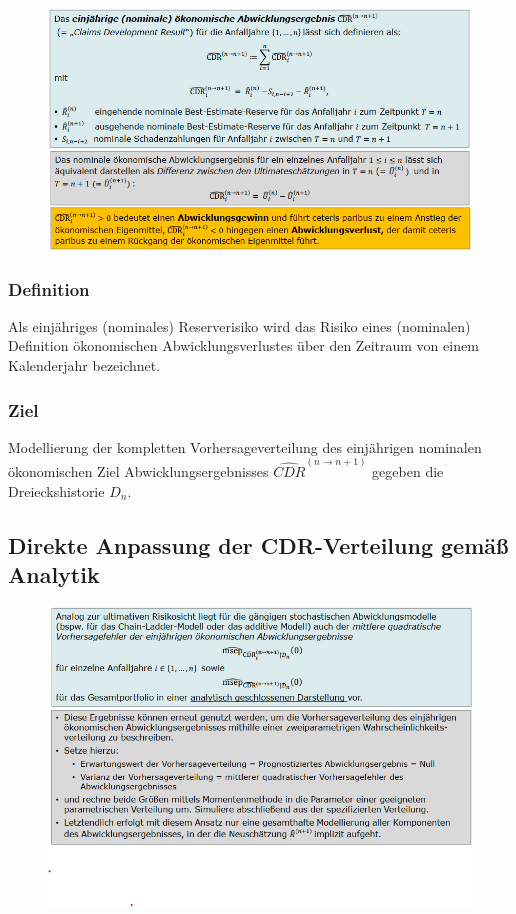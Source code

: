 \documentclass[12pt]{report}
\theoremstyle{dotless}
\theoremstyle{definition}
\begin{document}
\begin{figure}[ht]
	\centering
	\includegraphics[width= \textwidth]{Bilder/AbwErg.png}
\end{figure}

\subsubsection{Definition}
Als einjähriges (nominales) Reserverisiko wird das Risiko eines (nominalen)
Definition ökonomischen Abwicklungsverlustes über den Zeitraum von einem Kalenderjahr bezeichnet.

\subsubsection{Ziel}
Modellierung der kompletten Vorhersageverteilung des einjährigen nominalen ökonomischen Ziel Abwicklungsergebnisses $\hat{CDR}^{(n\rightarrow n+1)}$ gegeben die Dreieckshistorie $D_n$.

\subsection{Direkte Anpassung der CDR-Verteilung gemäß Analytik}

\begin{figure}[ht]
	\centering
	\includegraphics[width= \textwidth]{Bilder/Merz1.png}
\end{figure}
\end{document}

